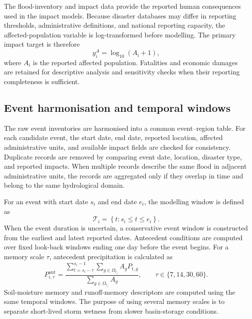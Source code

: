 \documentclass[pdflatex,sn-mathphys-ay]{sn-jnl}
\theoremstyle{thmstyleone}
\theoremstyle{thmstylethree}
\theoremstyle{thmstyletwo}
\begin{document}
\begin{appendices}
The flood-inventory and impact data provide the reported human
consequences used in the impact models.  Because disaster databases
may differ in reporting thresholds, administrative definitions, and
national reporting capacity, the affected-population variable is
log-transformed before modelling.  The primary impact target is
therefore
\begin{equation}
  y^{A}_{i}
  =
  \log_{10}
  \left(
    A_i+1
  \right),
  \label{eq:app_log_impact}
\end{equation}
where $A_i$ is the reported affected population.  Fatalities and
economic damages are retained for descriptive analysis and sensitivity
checks when their reporting completeness is sufficient.

\subsection{Event harmonisation and temporal windows}
\label{app:event_harmonisation}

The raw event inventories are harmonised into a common event--region
table.  For each candidate event, the start date, end date, reported
location, affected administrative units, and available impact fields
are checked for consistency.  Duplicate records are removed by
comparing event date, location, disaster type, and reported impacts.
When multiple records describe the same flood in adjacent
administrative units, the records are aggregated only if they overlap
in time and belong to the same hydrological domain.

For an event with start date $s_i$ and end date $e_i$, the modelling
window is defined as
\begin{equation}
  \mathcal{T}_{i}
  =
  \left\{
    t:s_i\leq t\leq e_i
  \right\}.
  \label{eq:app_event_window}
\end{equation}
When the event duration is uncertain, a conservative event window is
constructed from the earliest and latest reported dates.  Antecedent
conditions are computed over fixed look-back windows ending one day
before the event begins.  For a memory scale $\tau$, antecedent
precipitation is calculated as
\begin{equation}
  P^{\mathrm{ant}}_{i,\tau}
  =
  \frac{
    \displaystyle
    \sum_{t=s_i-\tau}^{s_i-1}
    \sum_{g\in\Omega_{r_i}} A_g P_{t,g}
  }{
    \displaystyle
    \sum_{g\in\Omega_{r_i}} A_g
  },
  \qquad
  \tau\in\{7,14,30,60\}.
  \label{eq:app_antecedent_precip}
\end{equation}
Soil-moisture memory and runoff-memory descriptors are computed using
the same temporal windows.  The purpose of using several memory scales
is to separate short-lived storm wetness from slower basin-storage
conditions.


\end{appendices}
\end{document}
